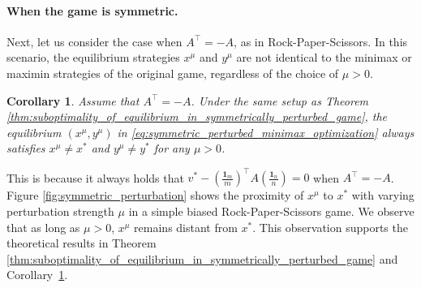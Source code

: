 \documentclass{article}
\newcommand{\bone}{\mathbf{1}}
\theoremstyle{plain}
\newtheorem{corollary}[theorem]{Corollary}
\begin{document}
\paragraph{When the game is symmetric.}
Next, let us consider the case when $A^\top = -A$, as in Rock-Paper-Scissors. In this scenario, the equilibrium strategies $x^\mu$ and $y^{\mu}$ are not identical to the minimax or maximin strategies of the original game, regardless of the choice of $\mu > 0$.
\begin{corollary}
    Assume that $A^{\top} = -A$.
    Under the same setup as Theorem \ref{thm:suboptimality_of_equilibrium_in_symmetrically_perturbed_game}, the equilibrium $(x^{\mu}, y^{\mu})$ in \eqref{eq:symmetric_perturbed_minimax_optimization} always satisfies $x^{\mu} \neq x^{\ast}$ and $y^{\mu} \neq y^{\ast}$ for any $\mu > 0$.
    \label{cor:suboptimality_of_equilibrium_in_symmetrically_perturbed_game}
\end{corollary}
This is because it always holds that $v^{\ast} - \left(\frac{\bone_m}{m}\right)^{\top}A\left(\frac{\bone_n}{n}\right) = 0$ when $A^{\top} = -A$.
Figure \ref{fig:symmetric_perturbation} shows the proximity of $x^{\mu}$ to $x^{\ast}$ with varying perturbation strength $\mu$ in a simple biased Rock-Paper-Scissors game.
We observe that as long as $\mu > 0$, $x^{\mu}$ remains distant from $x^{\ast}$.
This observation supports the theoretical results in Theorem \ref{thm:suboptimality_of_equilibrium_in_symmetrically_perturbed_game} and Corollary~\ref{cor:suboptimality_of_equilibrium_in_symmetrically_perturbed_game}.
\end{document}

